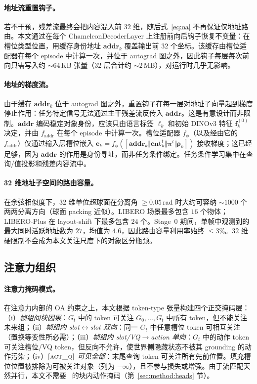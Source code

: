 \paragraph{地址流重置钩子。}
若不干预，残差流最终会把内容混入前 $32$ 维，随后式~\eqref{eq:oa} 不再保证仅地址路由。本文通过在每个 $\mathrm{ChameleonDecoderLayer}$ 上注册前向后钩子恢复不变量：在槽位类型位置，用缓存身份地址 $\mathbf{addr}_k$ 覆盖输出前 $32$ 个坐标。该缓存由槽位适配器在每个 episode 中计算一次，并位于 autograd 图之外，因此钩子每层每次前向只需写入约 $\sim\!64$\,KB 张量（$32$ 层合计约 $\sim\!2$\,MB），对运行时几乎无影响。

\paragraph{地址的梯度流。}
由于缓存 $\mathbf{addr}_k$ 位于 autograd 图之外，重置钩子在每一层对地址子向量起到梯度停止作用：任务特定信号无法通过主干残差流反传入 $\mathbf{addr}$。这是有意设计而非限制。$\mathbf{addr}$ 编码稳定对象身份，应该只由语言标签 $\boldsymbol{\ell}_k$ 和初始 DINOv3 特征 $\mathbf{f}_k^{(0)}$ 决定，并由 $f_\mathrm{addr}$ 在每个 episode 中计算一次。槽位适配器 $f_\phi$（以及经由它的 $f_\mathrm{addr}$）仅通过输入层槽位嵌入 $\mathbf{e}_k=f_\phi([\mathbf{addr}_k\Vert\mathbf{cnt}_k^t\Vert\boldsymbol{\pi}^t\Vert\boldsymbol{\rho}_k])$ 接收梯度；这已经足够，因为 $\mathbf{addr}$ 的作用是身份寻址，而非任务条件绑定。任务条件学习集中在查询/值投影和残差内容流中。

\paragraph{32 维地址子空间的路由容量。}
在余弦相似度下，$32$ 维单位超球面在分离角 $\geq 0.05$\,rad 时大约可容纳 $\sim\!1000$ 个两两分离方向（球面 packing 近似）。LIBERO 场景最多包含 $16$ 个物体；LIBERO-Plus 在 layout-shift 下最多包含 $24$ 个。Stage~0 期间，单帧中观测到的最大同时活跃地址数为 $27$，均值为 $4.6$，因此路由容量利用率始终 $\leq 3\%$。$32$ 维硬限制不会成为本文关注尺度下的对象区分瓶颈。

\subsection*{注意力组织}

\paragraph{注意力掩码模式。}
在注意力内部的 OA 约束之上，本文根据 token-type 张量构建四个正交掩码层：（i）\emph{帧组间块因果}：$G_t$ 中的 token 可关注 $G_0,\dots,G_t$ 中所有 token，但不能关注未来组；（ii）\emph{帧组内 slot$\leftrightarrow$slot 双向}：同一 $G_t$ 中任意槽位 token 可相互关注（置换等变性所必需）；（iii）\emph{帧组内 slot/VQ$\to$action 单向}：$G_t$ 中的动作 token 可关注槽位/VQ token，但反向不允许，使世界侧隐藏状态不被其 grounding 的动作污染；（iv）\emph{$\textsc{[act\_q]}$ 可见全部}：末尾查询 token 可关注所有先前位置。填充槽位位置被排除为可被关注对象（列为 $-\infty$），且不参与损失或增强。由于流匹配天然并行，本文不需要~\citep{rynnvla002,worldvla} 的块内动作掩码（第~\ref{sec:method:heads} 节）。

